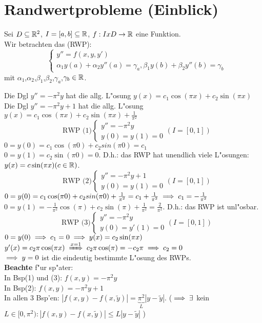 \documentclass[a4paper,twoside,DIV15,BCOR12mm]{scrbook}
\begin{document}
\chapter{Randwertprobleme (Einblick)}

Sei $D \subseteq \mathbb{R}^2$, $I=[a,b]\subseteq \mathbb{R}$, $f:I x D \to \mathbb{R}$ eine Funktion. \\
Wir betrachten das  (RWP):
\[ \quad
\begin{cases}
y''=f(x,y,y') \\ \alpha_1 y(a) + \alpha_2 y''(a) = \gamma_a, \beta_1 y(b) + \beta_2 y''(b) = \gamma_b
\end{cases}
\]
mit $\alpha_1$,$\alpha_2$,$\beta_1$,$\beta_2$,$\gamma_a$,$\gamma_b \in \mathbb{R}$.\\
\begin{beispiel}
Die Dgl $y''=-\pi^2 y$ hat die allg. L"osung $y(x) = c_1 \cos(\pi x)+c_2 \sin(\pi x)$\\
Die Dgl $y''=-\pi^2 y + 1$ hat die allg. L"osung $y(x) = c_1 \cos(\pi x)+c_2 \sin(\pi x)+\frac{1}{\pi^2}$\\
\[ \quad
\text{RWP (1)}
\begin{cases}
y'' = -\pi^2 y\\
y(0)=y(1)=0
\end{cases}
(I=[0,1])
\]
$0=y(0)=c_1\cos(\pi0) + c_2sin(\pi0)=c_1$\\
$0=y(1)=c_2\sin(\pi0)=0$. D.h.: das RWP hat unendlich viele L"osungen: $y(x)=c\sin(\pi x) (c\in\mathbb{R})$.\\
\[ \quad
\text{RWP (2)}
\begin{cases}
y'' = -\pi^2 y+1\\
y(0)=y(1)=0
\end{cases}
(I=[0,1])
\]
$0=y(0)=c_1\cos(\pi0) + c_2sin(\pi0)+\frac{1}{\pi^2}=c_1+\frac{1}{\pi^2}\implies c_1=-\frac{1}{\pi^2}$\\
$0=y(1)=-\frac{1}{\pi^2}\cos(\pi)+c_2\sin(\pi)+\frac{1}{\pi^2}=\frac{2}{\pi^2}$. D.h.: das RWP ist unl"osbar.\\
\[ \quad
\text{RWP (3)}
\begin{cases}
y'' = -\pi^2y\\
y(0)=y'(1)=0
\end{cases}
(I=[0,1])
\]
$0=y(0)\implies c_1=0 \implies y(x)=c_2\sin(\pi x)$\\
$y'(x) = c_2\pi\cos(\pi x) \folgtwegen{x=1} c_2\pi\cos(\pi) = -c_2\pi \folgt c_2 = 0$\\
$\implies y=0$ ist die eindeutig bestimmte L"osung des RWPs.\\

\textbf{Beachte} f"ur sp"ater:\\
In Bsp(1) und (3): $f(x,y)=-\pi^2 y$\\
In Bsp(2): $f(x,y)=-\pi^2 y+1$\\
In allen 3 Bsp'en: $|f(x,y)-f(x,\tilde y)|=\underbrace{\pi^2}_L |y-\tilde y|$.
($\implies \exists$ kein $L\in[0,\pi^2):|f(x,y)-f(x,\tilde y)|\le L|y-\tilde y|$ )
\end{beispiel}  
\end{document}
